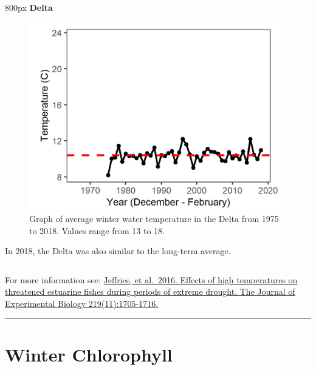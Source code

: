 \documentclass[
]{book}
\begin{document}
\begin{column}{800px\textwidth}
\textbf{Delta}

\begin{figure}
\includegraphics[width=15.25in]{figures/temp_dtwinter} \caption{Graph of average winter water temperature in the Delta from 1975 to 2018. Values range from 13 to 18.}\label{fig:unnamed-chunk-154}
\end{figure}

In 2018, the Delta was also similar to the long-term average.
\end{column}

\begin{disclaimer}
For more information see:
\href{https://jeb.biologists.org/content/219/11/1705.short}{Jeffries, et
al.~2016. Effects of high temperatures on threatened estuarine fishes
during periods of extreme drought. The Journal of Experimental Biology
219(11):1705-1716.}
\end{disclaimer}

\begin{center}\rule{0.5\linewidth}{0.5pt}\end{center}

\hypertarget{winter-chlorophyll}{%
\section{Winter Chlorophyll}\label{winter-chlorophyll}}
\end{document}
